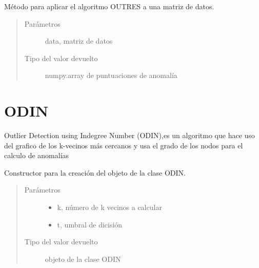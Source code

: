 \documentclass[letterpaper,10pt,spanish]{sphinxmanual}
\begin{document}

\begin{fulllineitems}
Método para aplicar el algoritmo OUTRES a una matriz de datos.
\begin{quote}\begin{description}
\item[{Parámetros}] \leavevmode
{} \textendash{} data, matriz de datos

\item[{Tipo del valor devuelto}] \leavevmode
numpy.array de puntuaciones de anomalía

\end{description}\end{quote}

\end{fulllineitems}



\chapter{ODIN}
\label{\detokenize{index:odin}}
Outlier Detection using Indegree Number (ODIN),es un algoritmo que hace
uso del grafico de los k-vecinos más cercanos y usa el grado de los nodos
para el calculo de anomalías

\begin{fulllineitems}
\label{\detokenize{index:ODIN}}
Constructor para la creación del objeto de la clase ODIN.
\begin{quote}\begin{description}
\item[{Parámetros}] \leavevmode\begin{itemize}
\item {} 
 \textendash{} k, número de k vecinos a calcular

\item {} 
 \textendash{} t, umbral de dicisión

\end{itemize}

\item[{Tipo del valor devuelto}] \leavevmode
objeto de la clase ODIN

\end{description}\end{quote}

\end{fulllineitems}
\end{document}
